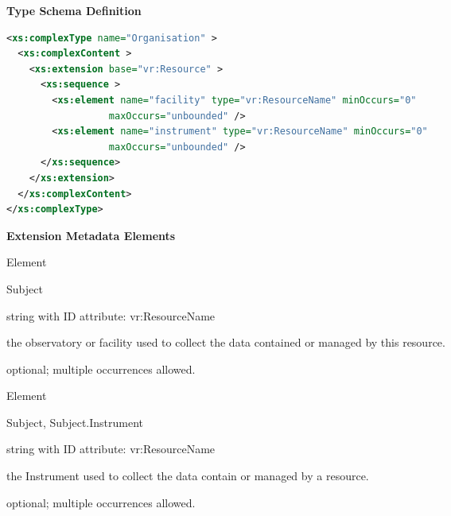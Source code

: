 \documentclass[11pt,a4paper]{ivoa}
\begin{document}

\vspace{1ex}\noindent\textbf{ Type Schema Definition}

\begin{lstlisting}[language=XML,basicstyle=\footnotesize]
<xs:complexType name="Organisation" >
  <xs:complexContent >
    <xs:extension base="vr:Resource" >
      <xs:sequence >
        <xs:element name="facility" type="vr:ResourceName" minOccurs="0"
                  maxOccurs="unbounded" />
        <xs:element name="instrument" type="vr:ResourceName" minOccurs="0"
                  maxOccurs="unbounded" />
      </xs:sequence>
    </xs:extension>
  </xs:complexContent>
</xs:complexType>
\end{lstlisting}

\vspace{0.5ex}\noindent\textbf{ Extension Metadata Elements}

\begingroup\small\begin{bigdescription}\item[Element \xmlel{facility}]
\begin{description}
Subject
\item[Type] string with ID attribute: vr:ResourceName
\item[Meaning] 
                       the observatory or facility used to collect the data 
                       contained or managed by this resource.  
                     
\item[Occurrence] optional; multiple occurrences allowed.

\end{description}
\item[Element \xmlel{instrument}]
\begin{description}
Subject, Subject.Instrument
\item[Type] string with ID attribute: vr:ResourceName
\item[Meaning] 
                       the Instrument used to collect the data contain or 
                       managed by a resource.  
                     
\item[Occurrence] optional; multiple occurrences allowed.

\end{description}


\end{bigdescription}\endgroup
\end{document}

